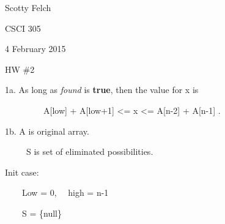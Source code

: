 \documentclass{article}
\newcommand{\tmem}[1]{{\em #1\/}}
\newcommand{\tmstrong}[1]{\textbf{#1}}
\begin{document}
Scotty Felch

CSCI 305

4 February 2015

HW \#2



1a. As long as {\tmem{found}} is {\tmstrong{true}}, then the value for x is

\ \ \ \ \ \ \ \ \ A[low] + A[low+1] <= x <= A[n-2] + A[n-1] .



1b. A is original array.

\ \ \ \ \ S is set of eliminated possibilities.

Init case:

\ \ \ \ Low = 0, \ \ high = n-1

\ \ \ \ S = \{null\}
\end{document}
